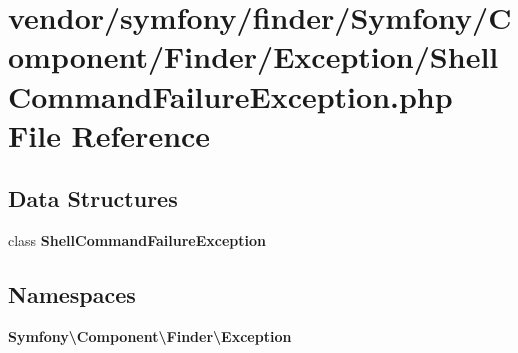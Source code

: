 \section{vendor/symfony/finder/\+Symfony/\+Component/\+Finder/\+Exception/\+Shell\+Command\+Failure\+Exception.php File Reference}
\label{_shell_command_failure_exception_8php}
\subsection*{Data Structures}
\begin{DoxyCompactItemize}
\item 
class {\bf Shell\+Command\+Failure\+Exception}
\end{DoxyCompactItemize}
\subsection*{Namespaces}
\begin{DoxyCompactItemize}
\item 
 {\bf Symfony\textbackslash{}\+Component\textbackslash{}\+Finder\textbackslash{}\+Exception}
\end{DoxyCompactItemize}
